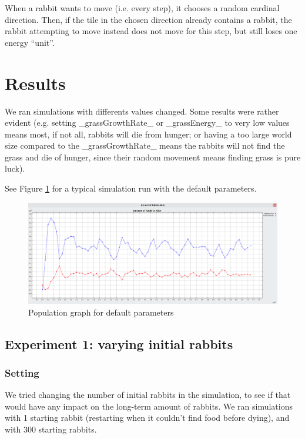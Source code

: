 \documentclass[11pt]{article}
\begin{document}
When a rabbit wants to move (i.e. every step), it chooses a random cardinal direction. Then, if the tile in the chosen direction already contains a rabbit, the rabbit attempting to move instead does not move for this step, but still loses one energy ``unit''.


\section{Results}
We ran simulations with differents values changed. Some results were rather evident (e.g. setting _grassGrowthRate_ or _grassEnergy_ to very low values means most, if not all, rabbits will die from hunger; or having a too large world size compared to the _grassGrowthRate_ means the rabbits will not find the grass and die of hunger, since their random movement means finding grass is pure luck).

See Figure \ref{fig:default} for a typical simulation run with the default parameters.

\begin{figure}[h]
	\includegraphics[width=\textwidth]{default}
	\caption{Population graph for default parameters}
	\label{fig:default}
\end{figure}

\subsection{Experiment 1: varying initial rabbits}

\subsubsection{Setting}
We tried changing the number of initial rabbits in the simulation, to see if that would have any impact on the long-term amount of rabbits. We ran simulations with 1 starting rabbit (restarting when it couldn't find food before dying), and with 300 starting rabbits.
\end{document}
